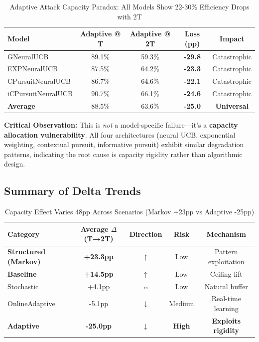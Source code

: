 \documentclass[11pt,a4paper]{article}
\newcommand{\critical}[1]{\textcolor{criticalcolor}{\textbf{#1}}}
\newcommand{\success}[1]{\textcolor{successcolor}{\textbf{#1}}}
\begin{document}
\begin{table}[h]
\scriptsize
\centering
\begin{tabular}{lcccc}
\toprule
\textbf{Model} & \textbf{Adaptive @ T} & \textbf{Adaptive @ 2T} & \textbf{Loss (pp)} & \textbf{Impact} \\
\midrule
GNeuralUCB & 89.1\% & 59.3\% & \critical{-29.8} & Catastrophic \\
EXPNeuralUCB & 87.5\% & 64.2\% & \critical{-23.3} & Catastrophic \\
CPursuitNeuralUCB & 86.7\% & 64.6\% & \critical{-22.1} & Catastrophic \\
iCPursuitNeuralUCB & 90.7\% & 66.1\% & \critical{-24.6} & Catastrophic \\
\midrule
\textbf{Average} & 88.5\% & 63.6\% & \critical{-25.0} & \critical{Universal} \\
\bottomrule
\end{tabular}
\vspace{-0.2cm}
\caption{Adaptive Attack Capacity Paradox: All Models Show 22-30\% Efficiency Drops with 2T}
\label{tab:adaptive_collapse}
\end{table}

\vspace{-0.2cm}

\textbf{Critical Observation:} This is \textit{not} a model-specific failure—it's a \critical{capacity allocation vulnerability}. All four architectures (neural UCB, exponential weighting, contextual pursuit, informative pursuit) exhibit similar degradation patterns, indicating the root cause is capacity rigidity rather than algorithmic design.

\subsection{Summary of Delta Trends}

\vspace{-0.4cm}

\begin{table}[h]
\scriptsize
\centering
\begin{tabular}{lcccc}
\toprule
\textbf{Category} & \textbf{Average $\Delta$(T→2T)} & \textbf{Direction} & \textbf{Risk} & \textbf{Mechanism} \\
\midrule
\success{Structured (Markov)} & \success{+23.3pp} & ↑ & Low & Pattern exploitation \\
\success{Baseline} & \success{+14.5pp} & ↑ & Low & Ceiling lift \\
Stochastic & +4.1pp & ↔ & Low & Natural buffer \\
OnlineAdaptive & -5.1pp & ↓ & Medium & Real-time learning \\
\critical{Adaptive} & \critical{-25.0pp} & ↓ & \critical{High} & \critical{Exploits rigidity} \\
\bottomrule
\end{tabular}
\vspace{-0.2cm}
\caption{Capacity Effect Varies 48pp Across Scenarios (Markov +23pp vs Adaptive -25pp)}
\end{table}
\end{document}
